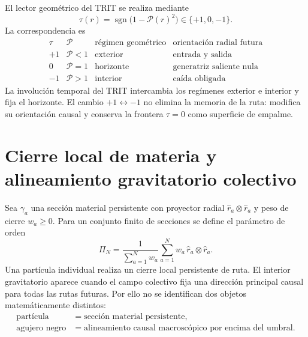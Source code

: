 El lector geométrico del TRIT se realiza mediante
\begin{equation}
 \tau(r)=\operatorname{sgn}\!\bigl(1-\mathcal P(r)^2\bigr)
 \in\{+1,0,-1\}.
 \label{eq:md-polarizacion-lector-trit}
\end{equation}
La correspondencia es
\begin{equation}
 \begin{array}{c|c|c|c}
 \tau & \mathcal P & \text{régimen geométrico} &
 \text{orientación radial futura}\\ \hline
 +1 & \mathcal P<1 & \text{exterior} & \text{entrada y salida}\\
 0  & \mathcal P=1 & \text{horizonte} & \text{generatriz saliente nula}\\
 -1 & \mathcal P>1 & \text{interior} & \text{caída obligada}
 \end{array}
 \label{eq:md-polarizacion-tabla-trit}
\end{equation}
La involución temporal del TRIT intercambia los regímenes exterior e interior
y fija el horizonte. El cambio \(+1\leftrightarrow-1\) no elimina la memoria
de la ruta: modifica su orientación causal y conserva la frontera
\(\tau=0\) como superficie de empalme.

\section{Cierre local de materia y alineamiento gravitatorio colectivo}
\label{sec:md-polarizacion-materia}

Sea \(\gamma_a\) una sección material persistente con proyector radial
\(\widehat r_a\otimes\widehat r_a\) y peso de cierre \(w_a\geq0\). Para un
conjunto finito de secciones se define el parámetro de orden
\begin{equation}
 \Pi_N
 =\frac{1}{\sum_{a=1}^{N}w_a}
  \sum_{a=1}^{N}w_a\,
  \widehat r_a\otimes\widehat r_a.
 \label{eq:md-polarizacion-colectiva}
\end{equation}
Una partícula individual realiza un cierre local persistente de ruta. El
interior gravitatorio aparece cuando el campo colectivo fija una dirección
principal causal para todas las rutas futuras. Por ello no se identifican dos
objetos matemáticamente distintos:
\begin{equation}
\begin{aligned}
 \text{partícula}
 &=\text{sección material persistente},\\
 \text{agujero negro}
 &=\text{alineamiento causal macroscópico por encima del umbral}.
\end{aligned}
 \label{eq:md-polarizacion-distincion}
\end{equation}

